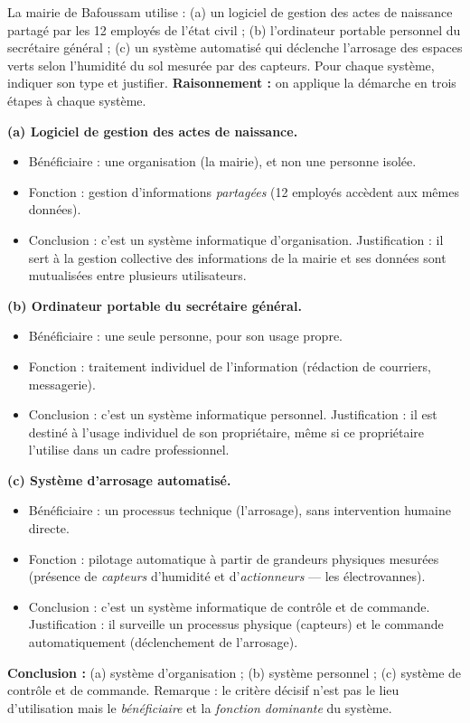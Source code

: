 \documentclass[11pt]{article}
\newcommand{\cle}[1]{{\popxbold\color{popdark}#1}}
\begin{document}
\begin{exoresolu}
La mairie de Bafoussam utilise : (a) un logiciel de gestion des actes de naissance partagé par les 12 employés de l'état civil ; (b) l'ordinateur portable personnel du secrétaire général ; (c) un système automatisé qui déclenche l'arrosage des espaces verts selon l'humidité du sol mesurée par des capteurs. Pour chaque système, indiquer son type et justifier.
\tcblower
\textbf{Raisonnement :} on applique la démarche en trois étapes à chaque système.

\textbf{(a) Logiciel de gestion des actes de naissance.}
\begin{itemize}
\item Bénéficiaire : une organisation (la mairie), et non une personne isolée.
\item Fonction : gestion d'informations \emph{partagées} (12 employés accèdent aux mêmes données).
\item Conclusion : c'est un \cle{système informatique d'organisation}. Justification : il sert à la gestion collective des informations de la mairie et ses données sont mutualisées entre plusieurs utilisateurs.
\end{itemize}

\textbf{(b) Ordinateur portable du secrétaire général.}
\begin{itemize}
\item Bénéficiaire : une seule personne, pour son usage propre.
\item Fonction : traitement individuel de l'information (rédaction de courriers, messagerie).
\item Conclusion : c'est un \cle{système informatique personnel}. Justification : il est destiné à l'usage individuel de son propriétaire, même si ce propriétaire l'utilise dans un cadre professionnel.
\end{itemize}

\textbf{(c) Système d'arrosage automatisé.}
\begin{itemize}
\item Bénéficiaire : un processus technique (l'arrosage), sans intervention humaine directe.
\item Fonction : pilotage automatique à partir de grandeurs physiques mesurées (présence de \emph{capteurs} d'humidité et d'\emph{actionneurs} — les électrovannes).
\item Conclusion : c'est un \cle{système informatique de contrôle et de commande}. Justification : il surveille un processus physique (capteurs) et le commande automatiquement (déclenchement de l'arrosage).
\end{itemize}

\textbf{Conclusion :} (a) système d'organisation ; (b) système personnel ; (c) système de contrôle et de commande. Remarque : le critère décisif n'est pas le lieu d'utilisation mais le \emph{bénéficiaire} et la \emph{fonction dominante} du système.
\end{exoresolu}
\end{document}
